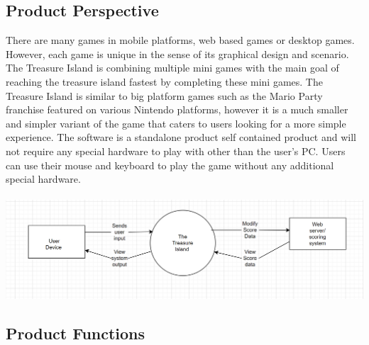 \documentclass[]{article}
\begin{document}
\subsection{Product Perspective}
\label{sub:product_perspective}


There are many games in mobile platforms, web based games or desktop games. However, each game is unique in the sense of its graphical design and scenario. The Treasure Island is combining multiple mini games with the main goal of reaching the treasure island fastest by completing these mini games. The Treasure Island is similar to big platform games such as the Mario Party franchise featured on various Nintendo platforms, however it is a much smaller and simpler variant of the game that caters to users looking for a more simple experience. The software is a standalone product self contained product and will not require any special hardware to play with other than the user's PC. Users can use their mouse and keyboard to play the game without any additional special hardware.\\\\

\includegraphics[width=\textwidth]{3A04BlockDiagram.png}


\subsection{Product Functions}
\label{sub:product_functions}

\end{document}
